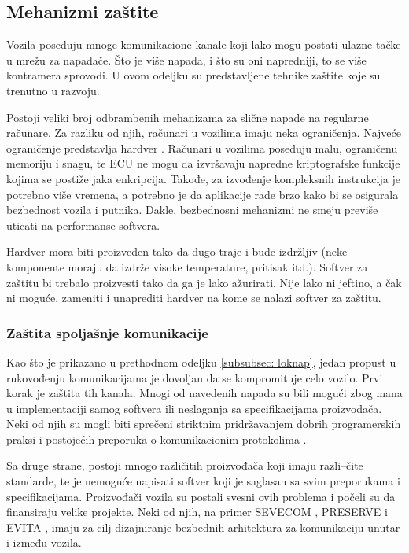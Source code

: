 \documentclass[a4paper]{article}
\begin{document}
\subsection{Mehanizmi zaštite}
\label{subsec:mehanizmi}

Vozila poseduju mnoge komunikacione kanale koji lako mogu postati ulazne tačke u mrežu za napadače. Što je više napada, i što su oni napredniji, to se više kontramera sprovodi. U ovom odeljku su predstavljene tehnike zaštite koje su trenutno u razvoju.

Postoji veliki broj odbrambenih mehanizama za slične napade na regularne računare. Za razliku od njih, računari u vozilima imaju neka ograničenja. Najveće ograničenje predstavlja hardver \cite{Wolf2007}. Računari u vozilima poseduju malu, ograničenu memoriju i snagu, te ECU ne mogu da izvršavaju napredne kriptografske funkcije kojima se postiže jaka enkripcija. Takođe, za izvođenje kompleksnih instrukcija je potrebno više vremena, a potrebno je da aplikacije rade brzo kako bi se osigurala bezbednost vozila i putnika. Dakle, bezbednosni mehanizmi ne smeju previše uticati na performanse softvera.    

Hardver mora biti proizveden tako da dugo traje i bude izdržljiv (neke komponente moraju da izdrže visoke temperature, pritisak itd.). Softver za zaštitu bi trebalo proizvesti tako da ga je lako ažurirati. Nije lako ni jeftino, a čak ni moguće, zameniti i unaprediti hardver na kome se nalazi softver za zaštitu.  


\subsubsection{Zaštita spoljašnje komunikacije}
\label{subsubsec: spoljkom}

Kao što je prikazano u prethodnom odeljku \ref{subsubsec: loknap}, jedan propust u rukovođenju komunikacijama je dovoljan da se kompromituje celo vozilo. Prvi korak je zaštita tih kanala. Mnogi od navedenih napada su bili mogući zbog mana u implementaciji samog softvera ili neslaganja sa specifikacijama proizvođača. Neki od njih su mogli biti sprečeni striktnim pridržavanjem dobrih programerskih praksi i postojećih preporuka o komunikacionim protokolima \cite{Padgette}.

Sa druge strane, postoji mnogo različitih proizvođača koji imaju razli--čite standarde, te je nemoguće napisati softver koji je saglasan sa svim preporukama i specifikacijama. Proizvođači vozila su postali svesni ovih problema i počeli su da finansiraju velike projekte. Neki od njih, na primer SEVECOM \cite{SEVECOM}, PRESERVE \cite{PRESERVE} i EVITA \cite{EVITA}, imaju za cilj dizajniranje bezbednih arhitektura za komunikaciju unutar i između vozila.
\end{document}
